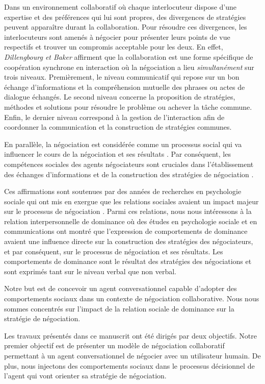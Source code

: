 Dans un environnement collaboratif où chaque interlocuteur dispose d'une expertise et des préférences qui lui sont propres, des divergences de stratégies peuvent apparaître durant la collaboration. 
Pour résoudre ces divergences, les interlocuteurs sont amenés à négocier pour présenter leurs points de vue respectifs et trouver un compromis acceptable pour les deux.  
En effet, \emph{Dillengbourg et Baker} \cite{dillenbourg1996negotiation} affirment que la collaboration est une forme spécifique de coopération synchrone en interaction où la négociation a lieu \textit{simultanément} sur trois niveaux. Premièrement, le niveau communicatif qui repose sur un bon échange d'informations et la compréhension mutuelle des phrases ou actes de dialogue échangés. Le second niveau concerne la proposition de stratégies, méthodes et solutions pour résoudre le problème ou achever la tâche commune. Enfin, le dernier niveau correspond à la gestion de l'interaction afin de coordonner la communication et la construction de stratégies communes.

En parallèle, la négociation est considérée comme un processus social qui va influencer le cours de la négociation et ses résultats \cite{broekens2010affective}. Par conséquent, les compétences sociales des agents négociateurs sont cruciales dans l'établissement des échanges d'informations et de la construction des stratégies de négociation \cite{jin2010study}. 

Ces affirmations sont soutenues par des années de recherches en psychologie sociale qui ont mis en exergue que les relations sociales avaient un impact majeur sur le processus de négociation \cite{thompson2010negotiation}. Parmi ces relations, nous nous intéressons à la relation interpersonnelle de dominance où des études en psychologie sociale et en communications ont montré que l'expression de comportements de dominance avaient une influence directe sur la construction des stratégies des négociateurs, et par conséquent, sur le processus de négociation et ses résultats.
Les comportements de dominance sont le résultat des stratégies des négociations et sont exprimés tant sur le niveau verbal que non verbal.

Notre but est de concevoir un agent conversationnel capable d'adopter des comportements sociaux dans un contexte de négociation collaborative. Nous nous sommes concentrés sur l'impact de la relation sociale de dominance sur la stratégie de négociation.

Les travaux présentés dans ce manuscrit ont été dirigés	par deux objectifs. 
Notre premier objectif est de présenter un modèle de négociation collaboratif permettant à un agent conversationnel de négocier avec un utilisateur humain. De plus, nous injectons des comportements sociaux dans le processus décisionnel de l'agent qui vont orienter sa stratégie de négociation.


